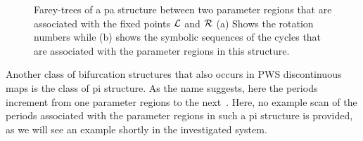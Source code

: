 \begin{figure}
{	}
	\quad
	\caption[Farey-trees of a  structure between two parameter regions that are associated with the fixed points $\L$ and $\R$]{
		Farey-trees of a \gls{pa} structure between two parameter regions that are associated with the fixed points $\L$ and $\R$
		(a) Shows the rotation numbers while (b) shows the symbolic sequences of the cycles that are associated with the parameter regions in this structure.
	}
	\label{fig:state.discont.adding.farey}
\end{figure}

Another class of bifurcation structures that also occurs in \gls{PWS} discontinuous maps is the class of \gls{pi} structure.
As the name suggests, here the periods increment from one parameter regions to the next~\cite{granados2017incrementing}.
Here, no example scan of the periods associated with the parameter regions in such a \gls{pi} structure is provided, as we will see an example shortly in the investigated system.

